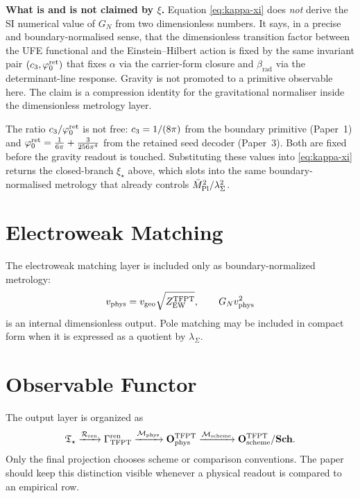 \documentclass[11pt,a4paper]{article}
\begin{document}
\begin{tfptfrontbox}
\textbf{What is and is not claimed by $\xi$.} Equation \eqref{eq:kappa-xi} does \emph{not} derive
the SI numerical value of $G_N$ from two dimensionless numbers. It says, in a precise and
boundary-normalised sense, that the dimensionless transition factor between the UFE functional
and the Einstein--Hilbert action is fixed by the same invariant pair $(c_3,\varphi_0^{\mathrm{ret}})$ that fixes
$\alpha$ via the carrier-form closure and $\beta_{\mathrm{rad}}$ via the determinant-line
response. Gravity is not promoted to a primitive observable here. The claim is a compression
identity for the gravitational normaliser inside the dimensionless metrology layer.
\end{tfptfrontbox}

\begin{remark}
The ratio $c_3/\varphi_0^{\mathrm{ret}}$ is not free: $c_3=1/(8\pi)$ from the boundary primitive (Paper~1)
and $\varphi_0^{\mathrm{ret}}=\frac{1}{6\pi}+\frac{3}{256\pi^4}$ from the retained seed decoder (Paper~3). Both are
fixed before the gravity readout is touched. Substituting these values into
\eqref{eq:kappa-xi} returns the closed-branch $\xi_\star$ above, which slots into the same
boundary-normalised metrology that already controls $\bar M_{\mathrm{Pl}}^2/\lambda_\Sigma^2$.
\end{remark}

\section{Electroweak Matching}

The electroweak matching layer is included only as boundary-normalized metrology:
\[
v_{\mathrm{phys}}=v_{\mathrm{geo}}\sqrt{Z_{\mathrm{EW}}^{\mathrm{TFPT}}},
\qquad
G_Nv_{\mathrm{phys}}^2
\]
is an internal dimensionless output. Pole matching may be included in compact form when it is
expressed as a quotient by $\lambda_\Sigma$.

\section{Observable Functor}

The output layer is organized as
\[
\mathfrak T_{\star}
\xrightarrow{\mathcal R_{\mathrm{ren}}}
\Gamma_{\mathrm{TFPT}}^{\mathrm{ren}}
\xrightarrow{\mathcal M_{\mathrm{phys}}}
\mathbf O_{\mathrm{phys}}^{\mathrm{TFPT}}
\xrightarrow{\mathcal M_{\mathrm{scheme}}}
\mathbf O_{\mathrm{scheme}}^{\mathrm{TFPT}}/\mathbf{Sch}.
\]
Only the final projection chooses scheme or comparison conventions. The paper should keep this
distinction visible whenever a physical readout is compared to an empirical row.
\end{document}
